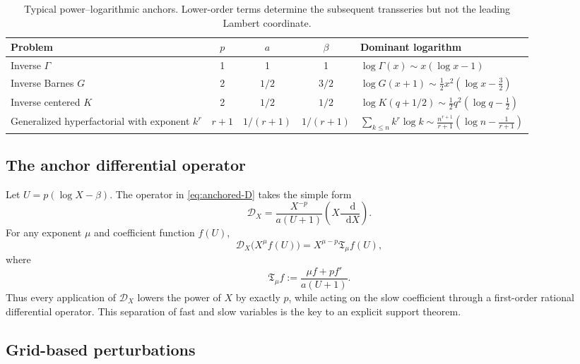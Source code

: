 \documentclass[11pt,oneside]{article}
\theoremstyle{plain}
\theoremstyle{definition}
\theoremstyle{remark}
\newcommand{\dd}{\mathop{}\!\mathrm{d}}
\newcommand{\calD}{\mathcal{D}}
\begin{document}
\begin{table}[htbp]
\centering
\caption{Typical power--logarithmic anchors.  Lower-order terms determine the
subsequent transseries but not the leading Lambert coordinate.}
\label{tab:anchor-examples}
\begin{tabularx}{\textwidth}{@{}lccc>{\raggedright\arraybackslash}X@{}}
\toprule
Problem & \(p\) & \(a\) & \(\beta\) & Dominant logarithm \\
\midrule
Inverse \(\Gamma\) & 1 & 1 & 1 &
 \(\log\Gamma(x)\sim x(\log x-1)\) \\
Inverse Barnes \(G\) & 2 & \(1/2\) & \(3/2\) &
 \(\log G(x+1)\sim\tfrac12x^2(\log x-\tfrac32)\) \\
Inverse centered \(K\) & 2 & \(1/2\) & \(1/2\) &
 \(\log K(q+1/2)\sim\tfrac12q^2(\log q-\tfrac12)\) \\
Generalized hyperfactorial with exponent \(k^r\) & \(r+1\) & \(1/(r+1)\) & \(1/(r+1)\) &
 \(\sum_{k\le n}k^r\log k\sim\frac{n^{r+1}}{r+1}
 (\log n-\frac1{r+1})\) \\
\bottomrule
\end{tabularx}
\end{table}

\subsection{The anchor differential operator}

Let \(U=p(\log X-\beta)\).  The operator in
\eqref{eq:anchored-D} takes the simple form
\begin{equation}
 \calD_X
 =\frac{X^{-p}}{a(U+1)}\left(X\frac{\dd}{\dd X}\right).
 \label{eq:general-D}
\end{equation}
For any exponent \(\mu\) and coefficient function \(f(U)\),
\begin{equation}
 \calD_X\bigl(X^\mu f(U)\bigr)
 =X^{\mu-p}\mathfrak{T}_\mu f(U),
 \label{eq:D-on-monomial}
\end{equation}
where
\begin{equation}
 \mathfrak{T}_\mu f
 :=\frac{\mu f+p f'}{a(U+1)}.
 \label{eq:Tmu-def}
\end{equation}
Thus every application of \(\calD_X\) lowers the power of \(X\) by exactly
\(p\), while acting on the slow coefficient through a first-order rational
differential operator.  This separation of fast and slow variables is the key
to an explicit support theorem.

\subsection{Grid-based perturbations}
\end{document}
